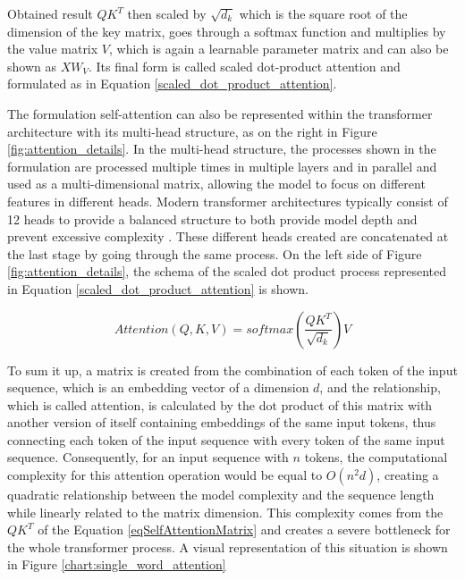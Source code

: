 \documentclass{iyte}
\begin{document}
Obtained result $QK^{T}$ then scaled by $\sqrt{d_k}$ which is the square root of the dimension of the key matrix, goes through a softmax function and multiplies by the value matrix $V$, which is again a learnable parameter matrix and can also be shown as $XW_{V}$. Its final form is called scaled dot-product attention and formulated as in Equation \ref{scaled_dot_product_attention}. 

The formulation self-attention can also be represented within the transformer architecture with its multi-head structure, as on the right in Figure \ref{fig:attention_details}. In the multi-head structure, the processes shown in the formulation are processed multiple times in multiple layers and in parallel and used as a multi-dimensional matrix, allowing the model to focus on different features in different heads. Modern transformer architectures typically consist of 12 heads to provide a balanced structure to both provide model depth and prevent excessive complexity \cite{attention_is_all_you_need}. These different heads created are concatenated at the last stage by going through the same process. On the left side of Figure \ref{fig:attention_details}, the schema of the scaled dot product process represented in Equation \ref{scaled_dot_product_attention} is shown.

\begin{equation}
\label{scaled_dot_product_attention}
Attention(Q, K, V) = softmax(\frac{QK^T}{\sqrt{d_k}})V
\end{equation}

To sum it up, a matrix is created from the combination of each token of the input sequence, which is an embedding vector of a dimension \(d\), and the relationship, which is called attention, is calculated by the dot product of this matrix with another version of itself containing embeddings of the same input tokens, thus connecting each token of the input sequence with every token of the same input sequence. Consequently, for an input sequence with \(n\) tokens, the computational complexity for this attention operation would be equal to \(O(n^2d)\), creating a quadratic relationship between the model complexity and the sequence length while linearly related to the matrix dimension. This complexity comes from the $QK^{T}$ of the Equation \ref{eqSelfAttentionMatrix} and creates a severe bottleneck for the whole transformer process. A visual representation of this situation is shown in Figure \ref{chart:single_word_attention}


\end{document}
